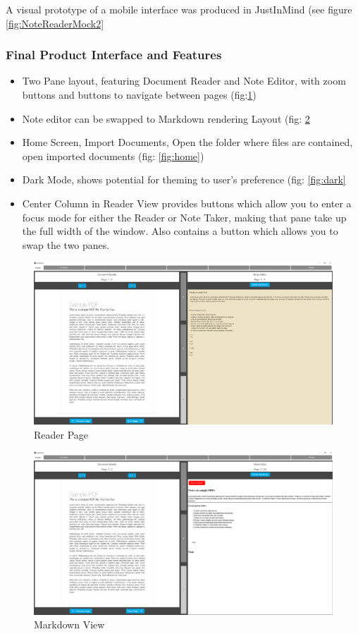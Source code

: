 A visual prototype of a mobile interface was produced in JustInMind (see figure \ref{fig:NoteReaderMock2}

\subsubsection{Final Product Interface and Features}
\begin{itemize}
    \item Two Pane layout, featuring Document Reader and Note Editor, with zoom buttons and buttons to navigate between pages (fig:\ref{fig:reader})
    \item Note editor can be swapped to Markdown rendering Layout (fig: \ref{fig:mdView}
    \item Home Screen, Import Documents, Open the folder where files are contained, open imported documents (fig: \ref{fig:home})
    \item Dark Mode, shows potential for theming to user's preference (fig: \ref{fig:dark}
    \item Center Column in Reader View provides buttons which allow you to enter a focus mode for either the Reader or Note Taker,  making that pane take up the full width of the window. Also contains a button which allows you to swap the two panes.
\end{itemize}

\begin{figure}
    \centering
    \includegraphics[width=1\linewidth]{image.png}
    \caption{Reader Page}
    \label{fig:reader}
\end{figure}


\begin{figure}
    \centering
    \includegraphics[width=1\linewidth]{Figures/image2.png}
    \caption{Markdown View}
    \label{fig:mdView}
\end{figure}

